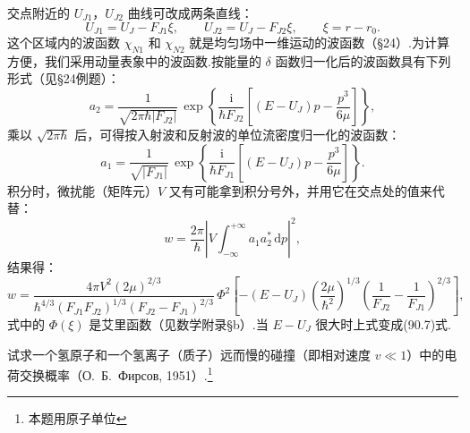 \begin{xiti}
交点附近的 $U_{J1}$，$U_{J2}$ 曲线可改成两条直线：
\begin{equation*}
  U_{J1}=U_J-F_{J1}\xi,\qquad
  U_{J2}=U_J-F_{J2}\xi,\qquad
  \xi=r-r_0.
\end{equation*}
这个区域内的波函数 $\chi_{N1}$ 和 $\chi_{N2}$ 就是均匀场中一维运动的波函数（§24）.为计算方便，我们采用动量表象中的波函数.按能量的 $\delta$ 函数归一化后的波函数具有下列形式（见§24例题）：
\begin{equation*}
  a_2=\frac{1}{\sqrt{2\pi\hbar|F_{J2}|}}\,
  \exp\left\{\frac{\mathrm{i}}{\hbar F_{J2}}
  \left[(E-U_J)p-\frac{p^3}{6\mu}\right]\right\},
\end{equation*}
乘以 $\sqrt{2\pi\hbar}$ 后，可得按入射波和反射波的单位流密度归一化的波函数：
\begin{equation*}
  a_1=\frac{1}{\sqrt{|F_{J1}|}}\,
  \exp\left\{\frac{\mathrm{i}}{\hbar F_{J1}}
  \left[(E-U_J)p-\frac{p^3}{6\mu}\right]\right\}.
\end{equation*}
积分时，微扰能（矩阵元）$V$ 又有可能拿到积分号外，并用它在交点处的值来代替：
\begin{equation*}
  w=\frac{2\pi}{\hbar}\left|V\int_{-\infty}^{+\infty}a_1a_2^*\,\mathrm{d}p\right|^2,
\end{equation*}
结果得：
\begin{equation*}
  w=\frac{4\pi V^2(2\mu)^{2/3}}{\hbar^{4/3}(F_{J1}F_{J2})^{1/3}(F_{J2}-F_{J1})^{2/3}}\,
  \varPhi^2\left[-(E-U_J)\left(\frac{2\mu}{\hbar^2}\right)^{1/3}
  \left(\frac{1}{F_{J2}}-\frac{1}{F_{J1}}\right)^{2/3}\right],
\end{equation*}
式中的 $\varPhi(\xi)$ 是艾里函数（见数学附录§b）.当 $E-U_J$ 很大时上式变成(90.7)式.

\quad 试求一个氢原子和一个氢离子（质子）远而慢的碰撞（即相对速度 $v\ll1$）中的电荷交换概率（О.~Б.~Фирсов, 1951）.\footnote{本题用原子单位}


\end{xiti}
